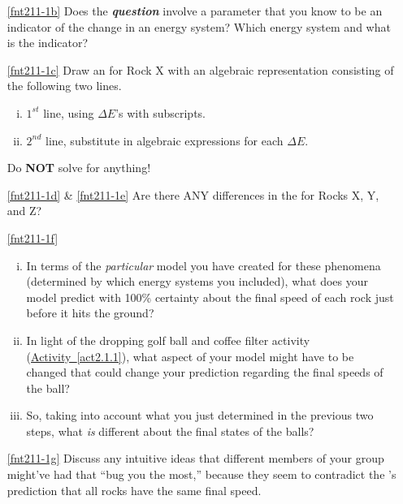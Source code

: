 \begin{enumerate}
	\item[\eqref{fnt211-1b}]	Does the \textbf{\em question} involve a parameter that you know to be an indicator of the change in an energy system?  Which energy system and what is the indicator?
	
	\item[\eqref{fnt211-1c}]	Draw an \EnergyDiagram{} for Rock X with an algebraic representation consisting of the following two lines.
	\begin{enumerate}[(i)]
		\item $1^{st}$ line, using $\Delta E$'s with subscripts.
		\item $2^{nd}$ line, substitute in algebraic expressions for each $\Delta E$.
	\end{enumerate}
	Do \textbf{NOT} solve for anything!
	
	\item[\eqref{fnt211-1d} \& \eqref{fnt211-1e}] Are there ANY differences in the \EnergyDiagrams{} for Rocks X, Y, and Z?
	
	\item[\eqref{fnt211-1f}] \begin{enumerate}[(i)]
		\item In terms of the {\em particular} model you have created for these phenomena (determined by which energy systems you included), what does your model predict with 100\% certainty about the final speed of each rock just before it hits the ground?
		\label{fnt211-1fi}
		
		\item In light of the dropping golf ball and coffee filter activity (\hyperref[act2.1.1]{Activity~\ref*{act2.1.1}}), what aspect of your model might have to be changed that could change your prediction regarding the final speeds of the ball?
		
		\item So, taking into account what you just determined in the previous two steps, what \emph{is} different about the final states of the balls?
	\end{enumerate}
	
	\item[\eqref{fnt211-1g}]	Discuss any intuitive ideas that different members of your group might've had that ``bug you the most,'' because they seem to contradict the \EnergyInteractionModel{}'s prediction that all rocks have the same final speed.
\end{enumerate}

